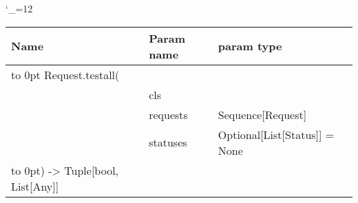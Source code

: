 \begingroup \catcode`\_=12 \tt
\begin{tabular}{lll}
\toprule
\textrm{Name}&\textrm{Param name}&\textrm{param type}\\
\midrule
\hbox to 0pt {Request.testall(\hss}\\
& cls\\
& requests & Sequence[Request]\\
& statuses & Optional[List[Status]] = None\\
\hbox to 0pt{) -> Tuple[bool, List[Any]]\hss}\\
\bottomrule
\end{tabular}
\endgroup

